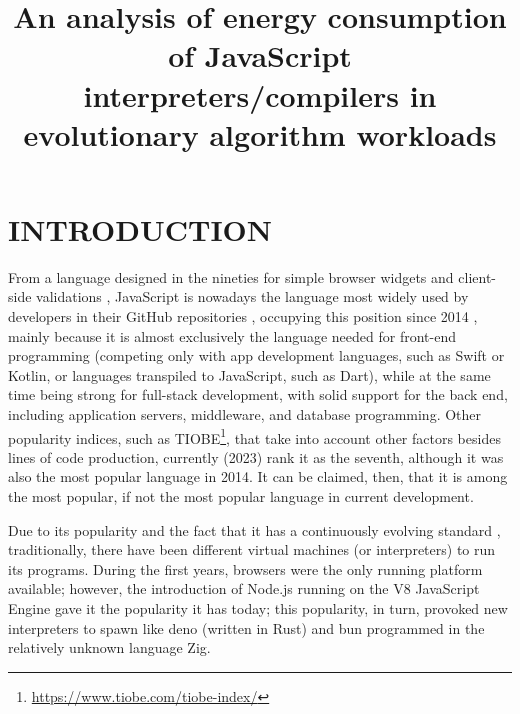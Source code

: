 \documentclass[a4paper,twoside]{article}
\begin{document}
\title{An analysis of energy consumption of JavaScript interpreters/compilers in evolutionary algorithm workloads}

\author{
}


\abstract{
}

\onecolumn \maketitle \normalsize \setcounter{footnote}{0} \vfill

\section{\uppercase{Introduction}}
\label{sec:introduction}

From a language designed in the nineties for simple browser widgets and
client-side validations \cite{goodman2007javascript,flanagan1998javascript},
JavaScript is nowadays the language most widely used by developers in their
GitHub repositories \cite{ogrady22:ranking}, occupying this position since 2014
\cite{ogrady14:ranking}, mainly because it is almost exclusively the language
needed for front-end programming (competing only with app development languages,
such as Swift or Kotlin, or languages transpiled to JavaScript, such as Dart),
while at the same time being strong for full-stack development, with solid
support for the back end, including application servers, middleware, and
database programming. Other popularity indices, such as
TIOBE\footnote{\url{https://www.tiobe.com/tiobe-index/}}, that take into account other
factors besides lines of code production, currently (2023) rank it as the seventh,
although it was also the most popular language in 2014. It can
be claimed, then, that it is among the most popular, if not the most popular
language in current development.

Due to its popularity and the fact that it has a
continuously evolving standard \cite{ecma1999262}, traditionally, there have
been different virtual machines (or interpreters) to run its programs. During
the first years, browsers were the only running platform available; however, the
introduction of Node.js running on the V8 JavaScript Engine \cite{5617064} gave
it the popularity it has today; this popularity, in turn, provoked new
interpreters to spawn like {\sf deno} \cite{runtimeintroducing} (written in
Rust) and {\sf bun} \cite{bun} programmed in the relatively unknown language
Zig.
\end{document}
